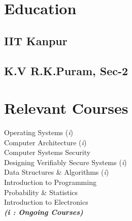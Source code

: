 \documentclass[]{deedy-resume-openfont}
\begin{document}
\begin{minipage}[t]{0.30\textwidth}

\vspace{-0.5cm}
\section{Education}

\subsection{IIT Kanpur}
\sectionsep{}

\subsection{K.V R.K.Puram, Sec-2}
\sectionsep{}
%


\section{Relevant Courses}
Operating Systems (\textit{i}) \\
Computer Architecture (\textit{i}) \\
Computer Systems Security \\
Designing Verifiably Secure Systems (\textit{i}) \\
Data Structures \& Algorithms (\textit{i}) \\
Introduction to Programming \\
Probability \& Statistics \\
Introduction to Electronics \\


{\footnotesize \textit{\textbf{ (i : Ongoing Courses)}}}


\vspace{0.2cm}

\end{minipage}
\end{document}
